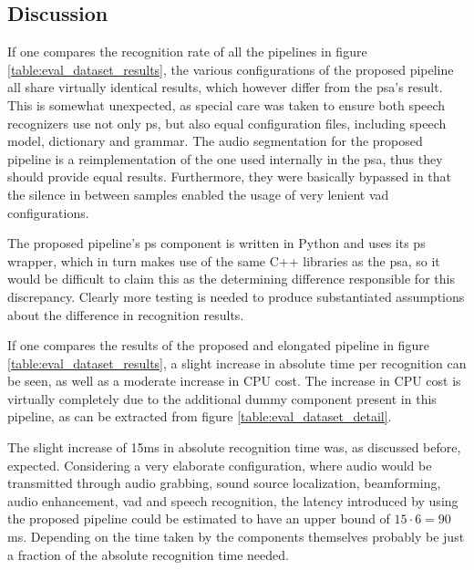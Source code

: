 \subsection{Discussion}
\label{eval:discussion}


{ %
If one compares the recognition rate of all the pipelines in figure \ref{table:eval_dataset_results}, the various configurations of the proposed pipeline all share virtually identical results, which however differ from the \gls{psa}'s result.
This is somewhat unexpected, as special care was taken to ensure both speech recognizers use not only \gls{ps}, but also equal configuration files, including speech model, dictionary and grammar.
The audio segmentation for the proposed pipeline is a reimplementation of the one used internally in the \gls{psa}, thus they should provide equal results.
Furthermore, they were basically bypassed in that the silence in between samples enabled the usage of very lenient \gls{vad} configurations.

The proposed pipeline's \gls{ps} component is written in Python and uses its \gls{ps} wrapper, which in turn makes use of the same C++ libraries as the \gls{psa}, so it would be difficult to claim this as the determining difference responsible for this discrepancy.
Clearly more testing is needed to produce substantiated assumptions about the difference in recognition results.
}


{ %
If one compares the results of the proposed and elongated pipeline in figure \ref{table:eval_dataset_results}, a slight increase in absolute time per recognition can be seen, as well as a moderate increase in CPU cost.
The increase in CPU cost is virtually completely due to the additional dummy component present in this pipeline, as can be extracted from figure \ref{table:eval_dataset_detail}. 

The slight increase of 15ms in absolute recognition time was, as discussed before, expected.
Considering a very elaborate configuration, where audio would be transmitted through audio grabbing, sound source localization, beamforming, audio enhancement, \gls{vad} and speech recognition, the latency introduced by using the proposed pipeline could be estimated to have an upper bound of $15\cdot6=90$ms.
Depending on the time taken by the components themselves probably be just a fraction of the absolute recognition time needed.
}


